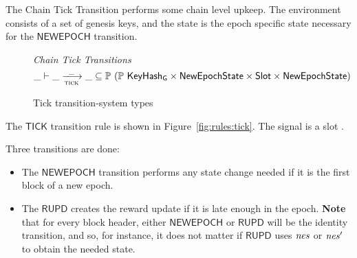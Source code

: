 The Chain Tick Transition performs some chain level
upkeep. The environment consists of a set of genesis keys, and the state is the
epoch specific state necessary for the $\mathsf{NEWEPOCH}$ transition.

\begin{figure}
  \emph{Chain Tick Transitions}
  \begin{equation*}
    \_ \vdash \var{\_} \trans{tick}{\_} \var{\_} \subseteq
    \powerset (\powerset{\KeyHashGen} \times \NewEpochState \times \Slot \times \NewEpochState)
  \end{equation*}
  \caption{Tick transition-system types}
  \label{fig:ts-types:tick}
\end{figure}

The $\mathsf{TICK}$ transition rule is shown in Figure~\ref{fig:rules:tick}.
The signal is a slot .

Three transitions are done:

\begin{itemize}
  \item The $\mathsf{NEWEPOCH}$ transition performs any state change needed if it is the first
    block of a new epoch.
  \item The $\mathsf{RUPD}$ creates the reward update if it is late enough in the epoch.
    \textbf{Note} that for every block header, either $\mathsf{NEWEPOCH}$ or $\mathsf{RUPD}$
    will be the identity transition, and so, for instance, it does not matter if $\mathsf{RUPD}$
    uses $\mathit{nes}$ or $\mathit{nes}'$ to obtain the needed state.
\end{itemize}

